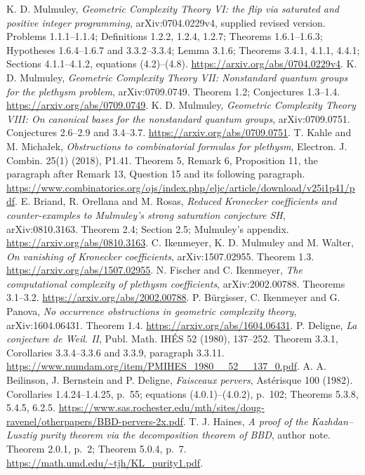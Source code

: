  K. D. Mulmuley, \emph{Geometric Complexity Theory VI: the flip via saturated and positive integer programming}, arXiv:0704.0229v4, supplied revised version. Problems 1.1.1--1.1.4; Definitions 1.2.2, 1.2.4, 1.2.7; Theorems 1.6.1--1.6.3; Hypotheses 1.6.4--1.6.7 and 3.3.2--3.3.4; Lemma 3.1.6; Theorems 3.4.1, 4.1.1, 4.4.1; Sections 4.1.1--4.1.2, equations (4.2)--(4.8). \url{https://arxiv.org/abs/0704.0229v4}.
 K. D. Mulmuley, \emph{Geometric Complexity Theory VII: Nonstandard quantum groups for the plethysm problem}, arXiv:0709.0749. Theorem 1.2; Conjectures 1.3--1.4. \url{https://arxiv.org/abs/0709.0749}.
 K. D. Mulmuley, \emph{Geometric Complexity Theory VIII: On canonical bases for the nonstandard quantum groups}, arXiv:0709.0751. Conjectures 2.6--2.9 and 3.4--3.7. \url{https://arxiv.org/abs/0709.0751}.
 T. Kahle and M. Micha\l ek, \emph{Obstructions to combinatorial formulas for plethysm}, Electron. J. Combin. 25(1) (2018), P1.41. Theorem 5, Remark 6, Proposition 11, the paragraph after Remark 13, Question 15 and its following paragraph. \url{https://www.combinatorics.org/ojs/index.php/eljc/article/download/v25i1p41/pdf}.
 E. Briand, R. Orellana and M. Rosas, \emph{Reduced Kronecker coefficients and counter-examples to Mulmuley's strong saturation conjecture SH}, arXiv:0810.3163. Theorem 2.4; Section 2.5; Mulmuley's appendix. \url{https://arxiv.org/abs/0810.3163}.
 C. Ikenmeyer, K. D. Mulmuley and M. Walter, \emph{On vanishing of Kronecker coefficients}, arXiv:1507.02955. Theorem 1.3. \url{https://arxiv.org/abs/1507.02955}.
 N. Fischer and C. Ikenmeyer, \emph{The computational complexity of plethysm coefficients}, arXiv:2002.00788. Theorems 3.1--3.2. \url{https://arxiv.org/abs/2002.00788}.
 P. B\"urgisser, C. Ikenmeyer and G. Panova, \emph{No occurrence obstructions in geometric complexity theory}, arXiv:1604.06431. Theorem 1.4. \url{https://arxiv.org/abs/1604.06431}.
 P. Deligne, \emph{La conjecture de Weil. II}, Publ. Math. IH\'ES 52 (1980), 137--252. Theorem 3.3.1, Corollaries 3.3.4--3.3.6 and 3.3.9, paragraph 3.3.11. \url{https://www.numdam.org/item/PMIHES_1980__52__137_0.pdf}.
 A. A. Beilinson, J. Bernstein and P. Deligne, \emph{Faisceaux pervers}, Ast\'erisque 100 (1982). Corollaries 1.4.24--1.4.25, p.~55; equations (4.0.1)--(4.0.2), p.~102; Theorems 5.3.8, 5.4.5, 6.2.5. \url{https://www.sas.rochester.edu/mth/sites/doug-ravenel/otherpapers/BBD-pervers-2x.pdf}.
 T. J. Haines, \emph{A proof of the Kazhdan--Lusztig purity theorem via the decomposition theorem of BBD}, author note. Theorem 2.0.1, p.~2; Theorem 5.0.4, p.~7. \url{https://math.umd.edu/~tjh/KL_purity1.pdf}.
